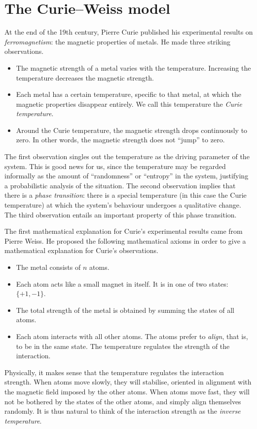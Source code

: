 \section{The Curie--Weiss model}
\label{sec:definitions_examples}

At the end of the 19th century, Pierre Curie published his experimental results on
\emph{ferromagnetism}:
the
magnetic properties of metals.
He made three striking observations.
\begin{itemize}
    \item The magnetic strength of a metal varies with the temperature.
        Increasing the temperature decreases the magnetic strength.
    \item Each metal has a certain temperature, specific to that metal,
        at which the magnetic properties disappear entirely.
        We call this temperature the \emph{Curie temperature}.
    \item Around the Curie temperature, the magnetic strength drops continuously
        to zero. In other words, the magnetic strength does not ``jump'' to zero.
\end{itemize}
The first observation singles out the temperature as the driving parameter of the system.
This is good news for us, since the temperature may be regarded informally as the amount of
``randomness'' or ``entropy'' in the system, justifying a probabilistic analysis of the situation.
The second observation implies that there is a \emph{phase transition}:
there is a special temperature (in this case the Curie temperature) at which
the system's behaviour undergoes a qualitative change.
The third observation entails an important property of this phase transition.

The first mathematical explanation for Curie's experimental results came from
Pierre Weiss.
He proposed the following mathematical axioms in order to give a mathematical explanation
for Curie's observations.
\begin{itemize}
    \item The metal consists of $n$ atoms.
    \item Each atom acts like a small magnet in itself.
        It is in one of two states: $\{+1,-1\}$.
    \item The total strength of the metal is obtained by summing the states of all atoms.
    \item Each atom interacts with all other atoms.
        The atoms prefer to \emph{align}, that is, to be in the same state.
        The temperature regulates the strength of the interaction.
\end{itemize}
Physically, it makes sense that the temperature regulates the interaction strength.
When atoms move slowly, they will stabilise, oriented in alignment with the magnetic
field imposed by the other atoms.
When atoms move fast, they will not be bothered by the states of the other atoms, and
simply align themselves randomly.
It is thus natural to think of the interaction strength as the \emph{inverse temperature}.

